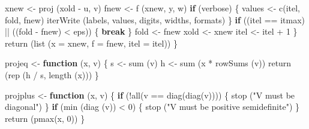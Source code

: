 \documentclass[
  12pt,
]{book}
\newenvironment{Shaded}{\begin{snugshade}}{\end{snugshade}}
\newcommand{\AttributeTok}[1]{\textcolor[rgb]{0.77,0.63,0.00}{#1}}
\newcommand{\ControlFlowTok}[1]{\textcolor[rgb]{0.13,0.29,0.53}{\textbf{#1}}}
\newcommand{\DecValTok}[1]{\textcolor[rgb]{0.00,0.00,0.81}{#1}}
\newcommand{\FunctionTok}[1]{\textcolor[rgb]{0.00,0.00,0.00}{#1}}
\newcommand{\NormalTok}[1]{#1}
\newcommand{\OtherTok}[1]{\textcolor[rgb]{0.56,0.35,0.01}{#1}}
\newcommand{\SpecialCharTok}[1]{\textcolor[rgb]{0.00,0.00,0.00}{#1}}
\newcommand{\StringTok}[1]{\textcolor[rgb]{0.31,0.60,0.02}{#1}}
\theoremstyle{definition}
\theoremstyle{definition}
\theoremstyle{definition}
\theoremstyle{definition}
\theoremstyle{remark}
\begin{document}
\begin{Shaded}
\begin{Highlighting}[]
\NormalTok{    xnew }\OtherTok{\textless{}{-}} \FunctionTok{proj}\NormalTok{ (xold }\SpecialCharTok{{-}}\NormalTok{ u, v)}
\NormalTok{    fnew }\OtherTok{\textless{}{-}} \FunctionTok{f}\NormalTok{ (xnew, y, w)}
    \ControlFlowTok{if}\NormalTok{ (verbose) \{}
\NormalTok{      values }\OtherTok{\textless{}{-}} \FunctionTok{c}\NormalTok{(itel, fold, fnew)}
      \FunctionTok{iterWrite}\NormalTok{ (labels, values, digits, widths, formats)}
\NormalTok{    \}}
    \ControlFlowTok{if}\NormalTok{ ((itel }\SpecialCharTok{==}\NormalTok{ itmax) }\SpecialCharTok{||}\NormalTok{ ((fold }\SpecialCharTok{{-}}\NormalTok{ fnew) }\SpecialCharTok{\textless{}}\NormalTok{ eps)) \{}
      \ControlFlowTok{break}
\NormalTok{    \}}
\NormalTok{    fold }\OtherTok{\textless{}{-}}\NormalTok{ fnew}
\NormalTok{    xold }\OtherTok{\textless{}{-}}\NormalTok{ xnew}
\NormalTok{    itel }\OtherTok{\textless{}{-}}\NormalTok{ itel }\SpecialCharTok{+} \DecValTok{1}
\NormalTok{  \}}
  \FunctionTok{return}\NormalTok{ (}\FunctionTok{list}\NormalTok{ (}\AttributeTok{x =}\NormalTok{ xnew, }\AttributeTok{f =}\NormalTok{ fnew, }\AttributeTok{itel =}\NormalTok{ itel))}
\NormalTok{\}}

\NormalTok{projeq }\OtherTok{\textless{}{-}} \ControlFlowTok{function}\NormalTok{ (x, v) \{}
\NormalTok{  s }\OtherTok{\textless{}{-}} \FunctionTok{sum}\NormalTok{ (v)}
\NormalTok{  h }\OtherTok{\textless{}{-}} \FunctionTok{sum}\NormalTok{ (x }\SpecialCharTok{*} \FunctionTok{rowSums}\NormalTok{ (v))}
  \FunctionTok{return}\NormalTok{ (}\FunctionTok{rep}\NormalTok{ (h }\SpecialCharTok{/}\NormalTok{ s, }\FunctionTok{length}\NormalTok{ (x)))}
\NormalTok{\}}

\NormalTok{projplus }\OtherTok{\textless{}{-}} \ControlFlowTok{function}\NormalTok{ (x, v) \{}
  \ControlFlowTok{if}\NormalTok{ (}\SpecialCharTok{!}\FunctionTok{all}\NormalTok{(v }\SpecialCharTok{==} \FunctionTok{diag}\NormalTok{(}\FunctionTok{diag}\NormalTok{(v)))) \{}
    \FunctionTok{stop}\NormalTok{ (}\StringTok{"V must be diagonal"}\NormalTok{)}
\NormalTok{  \}}
  \ControlFlowTok{if}\NormalTok{ (}\FunctionTok{min}\NormalTok{ (}\FunctionTok{diag}\NormalTok{ (v)) }\SpecialCharTok{\textless{}} \DecValTok{0}\NormalTok{) \{}
    \FunctionTok{stop}\NormalTok{ (}\StringTok{"V must be positive semidefinite"}\NormalTok{)}
\NormalTok{  \}}
  \FunctionTok{return}\NormalTok{ (}\FunctionTok{pmax}\NormalTok{(x, }\DecValTok{0}\NormalTok{))}
\NormalTok{\}}


\end{Highlighting}
\end{Shaded}
\end{document}
